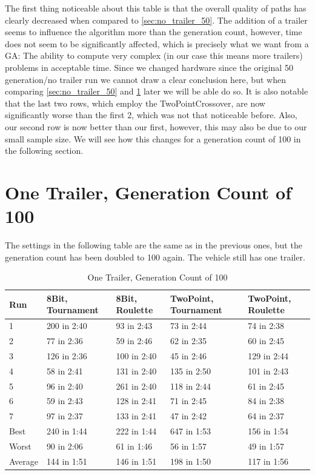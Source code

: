 The first thing noticeable about this table is that the overall quality of paths has clearly decreased when compared to \ref{sec:no_trailer_50}. The addition of a trailer seems to influence the algorithm more than the generation count, however, time does not seem to be significantly affected, which is precisely what we want from a GA: The ability to compute very complex (in our case this means more trailers) problems in acceptable time. Since we changed hardware since the original 50 generation/no trailer run we cannot draw a clear conclusion here, but when comparing \ref{sec:no_trailer_50} and \ref{sec:no_trailer_100} later we will be able do so. It is also notable that the last two rows, which employ the TwoPointCrossover, are now significantly worse than the first 2, which was not that noticeable before. Also, our second row is now better than our first, however, this may also be due to our small sample size. We will see how this changes for a generation count of 100 in the following section.

\section{One Trailer, Generation Count of 100}
\label{sec:no_trailer_100}

The settings in the following table are the same as in the previous ones, but the generation count has been doubled to 100 again. The vehicle still has one trailer.

\begin{table}\caption{One Trailer, Generation Count of 100}
\begin{center}
	\begin{tabular}{| l | l | l | p{3cm} | p{3cm}|}
		\hline
		Run 		& 8Bit, Tournament 	& 8Bit, Roulette 	& TwoPoint, Tournament 	& TwoPoint, Roulette	\\ \hline
		1				& 200 in 2:40				& 93 in 2:43			& 73 in 2:44						& 74 in 2:38					\\ \hline
		2				& 77 in 2:36				& 59 in 2:46			& 62 in 2:35						& 60 in 2:45					\\ \hline
		3				& 126 in 2:36				& 100 in 2:40			& 45 in 2:46						& 129 in 2:44					\\ \hline
		4				& 58 in 2:41				& 131 in 2:40			& 135 in 2:50						& 101 in 2:43					\\ \hline
		5				& 96 in 2:40				& 261 in 2:40			& 118 in 2:44						& 61 in 2:45					\\ \hline
		6				& 59 in 2:43				& 128 in 2:41			& 71 in 2:45						& 84 in 2:38					\\ \hline
		7				& 97 in 2:37				& 133 in 2:41			& 47 in 2:42						& 64 in 2:37					\\ \hline
		Best		&	240 in 1:44				&	222 in 1:44			&	647 in 1:53						&	156 in 1:54					\\ \hline
		Worst		&	90 in 2:06				&	61 in 1:46			&	56 in 1:57						& 49 in 1:57					\\ \hline
		Average	&	144 in 1:51				& 146 in 1:51			& 198 in 1:50						&	117 in 1:56					\\ \hline
		\hline
	\end{tabular}
\end{center}
\end{table}

